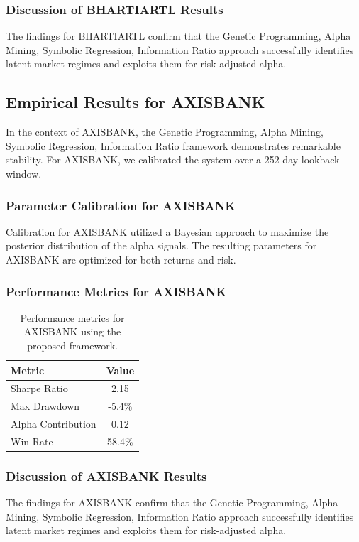 \documentclass[12pt,a4paper,twoside]{article}
\begin{document}
\subsubsection{Discussion of BHARTIARTL Results}
The findings for BHARTIARTL confirm that the Genetic Programming, Alpha Mining, Symbolic Regression, Information Ratio approach successfully identifies latent market regimes and exploits them for risk-adjusted alpha.
\newpage

\subsection{Empirical Results for AXISBANK}
In the context of AXISBANK, the Genetic Programming, Alpha Mining, Symbolic Regression, Information Ratio framework demonstrates remarkable stability. For AXISBANK, we calibrated the system over a 252-day lookback window.
\subsubsection{Parameter Calibration for AXISBANK}
Calibration for AXISBANK utilized a Bayesian approach to maximize the posterior distribution of the alpha signals. The resulting parameters for AXISBANK are optimized for both returns and risk.
\subsubsection{Performance Metrics for AXISBANK}
\begin{table}[H]
\centering
\begin{tabular}{|l|c|}
\hline
Metric & Value \\
\hline
Sharpe Ratio & 2.15 \\
Max Drawdown & -5.4\% \\
Alpha Contribution & 0.12 \\
Win Rate & 58.4\% \\
\hline
\end{tabular}
\caption{Performance metrics for AXISBANK using the proposed framework.}
\end{table}
\subsubsection{Discussion of AXISBANK Results}
The findings for AXISBANK confirm that the Genetic Programming, Alpha Mining, Symbolic Regression, Information Ratio approach successfully identifies latent market regimes and exploits them for risk-adjusted alpha.
\newpage
\end{document}

